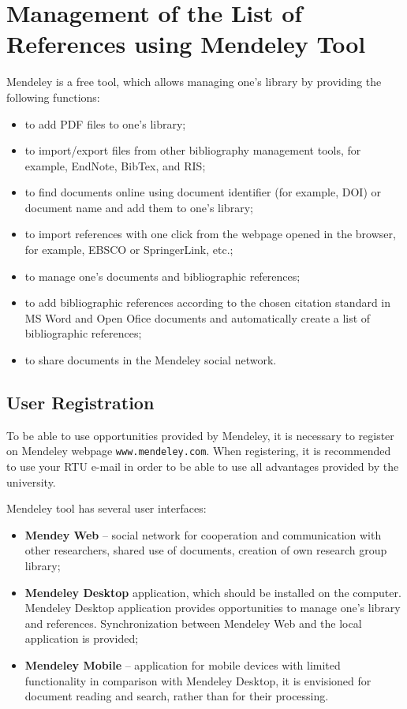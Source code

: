 \chapter{Management of the List of References using Mendeley Tool}

Mendeley is a free tool, which allows managing one’s library by providing the following
functions:
\begin{itemize}
  \item to add PDF files to one’s library;
  \item to import/export files from other bibliography management tools, for example,
  EndNote, BibTex, and RIS;
  \item to find documents online using document identifier (for example, DOI) or document name and add them to one’s library;
  \item to import references with one click from the webpage opened in the browser, for example, EBSCO or SpringerLink, etc.;
  \item to manage one’s documents and bibliographic references;
  \item to add bibliographic references according to the chosen citation standard in MS Word
  and Open Ofice documents and automatically create a list of bibliographic references;
  \item to share documents in the Mendeley social network.
\end{itemize}

\section{User Registration}

To be able to use opportunities provided by Mendeley, it is necessary to register on Mendeley webpage \texttt{www.mendeley.com}. When registering, it is recommended to use your RTU e-mail in order to be able to use all advantages provided by the university.

Mendeley tool has several user interfaces:
\begin{itemize}
  \item \textbf{Mendey Web} – social network for cooperation and communication with other researchers, shared use of documents, creation of own research group library;
  \item \textbf{Mendeley Desktop} application, which should be installed on the computer. Mendeley Desktop application provides opportunities to manage one’s library and references. Synchronization between Mendeley Web and the local application is provided;
  \item \textbf{Mendeley Mobile} – application for mobile devices with limited functionality in comparison with Mendeley Desktop, it is envisioned for document reading and search, rather than for their processing.
\end{itemize}

